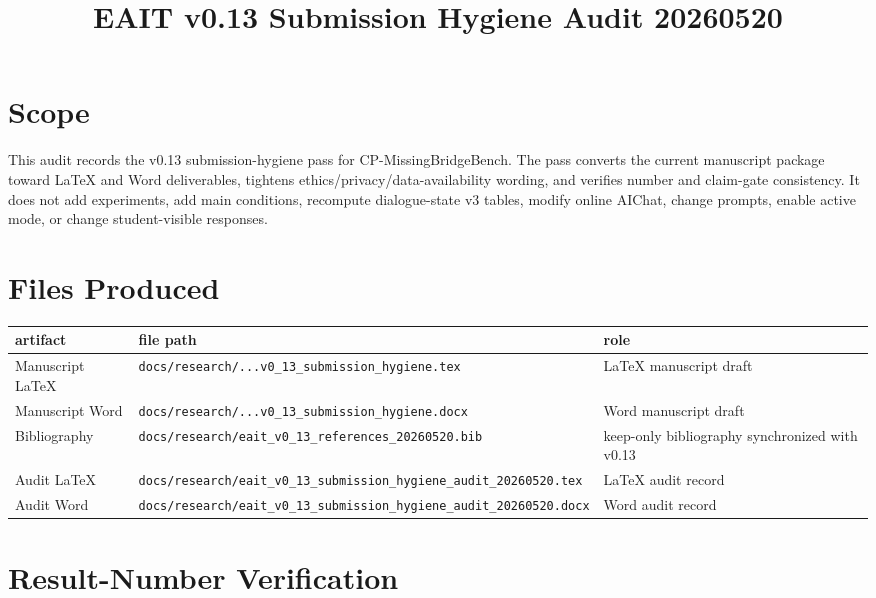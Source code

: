 \documentclass[11pt]{article}
\title{EAIT v0.13 Submission Hygiene Audit 20260520}
\author{}
\date{}
\begin{document}
\maketitle

\section{Scope}

This audit records the v0.13 submission-hygiene pass for CP-MissingBridgeBench. The pass converts the current manuscript package toward LaTeX and Word deliverables, tightens ethics/privacy/data-availability wording, and verifies number and claim-gate consistency. It does not add experiments, add main conditions, recompute dialogue-state v3 tables, modify online AIChat, change prompts, enable active mode, or change student-visible responses.

\section{Files Produced}

\begingroup
\small
\begin{xltabular}{\textwidth}{>{\raggedright\arraybackslash}X>{\raggedright\arraybackslash}X>{\raggedright\arraybackslash}X}
\toprule
artifact & file path & role \\
\midrule
Manuscript LaTeX & \texttt{docs/research/...v0\_13\_submission\_hygiene.tex} & LaTeX manuscript draft \\
Manuscript Word & \texttt{docs/research/...v0\_13\_submission\_hygiene.docx} & Word manuscript draft \\
Bibliography & \texttt{docs/research/eait\_v0\_13\_references\_20260520.bib} & keep-only bibliography synchronized with v0.13 \\
Audit LaTeX & \texttt{docs/research/eait\_v0\_13\_submission\_hygiene\_audit\_20260520.tex} & LaTeX audit record \\
Audit Word & \texttt{docs/research/eait\_v0\_13\_submission\_hygiene\_audit\_20260520.docx} & Word audit record \\
\bottomrule
\end{xltabular}
\endgroup

\section{Result-Number Verification}
\end{document}
